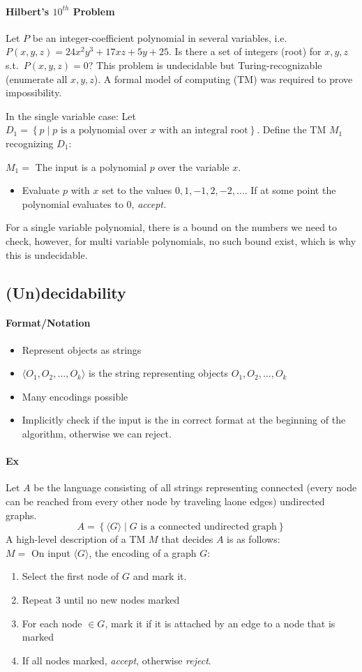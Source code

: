 \documentclass[12 pt]{article}
\begin{document}
\paragraph{Hilbert's $10^{th}$ Problem}
Let $P$ be an integer-coefficient polynomial in several variables,
i.e.\ $P(x,y,z)=24x^2y^3+17xz+5y+25$. Is there a set of integers
(root) for $x,y,z$ s.t.\ $P(x,y,z)=0$? This problem is undecidable but
Turing-recognizable (enumerate all $x,y,z$). A formal model of
computing (TM) was required to prove impossibility.

In the single variable case: Let $D_1 = \left\{p \mid p \text{ is a
    polynomial over } x \text{ with an integral root}\right\}$. Define
the TM $M_1$ recognizing $D_1$:

$M_1 =$ The input is a polynomial $p$ over the variable $x$.
\begin{itemize}
\item Evaluate $p$ with $x$ set to the values $0, 1, -1,
  2, -2, \ldots$. If at some point the polynomial evaluates to $0$,
  \textit{accept.}
\end{itemize}
For a single variable polynomial, there is a bound on the numbers we
need to check, however, for multi variable polynomials, no such bound
exist, which is why this is undecidable.
\subsection{(Un)decidability}
\paragraph{Format/Notation}
\begin{itemize}
\item Represent objects as strings
\item $\langle O_1, O_2, \ldots, O_k \rangle$ is the string
  representing objects $O_1, O_2, \ldots, O_k$
\item Many encodings possible
\item Implicitly check if the input is the in correct format at the
  beginning of the algorithm, otherwise we can reject.
\end{itemize}
\paragraph{Ex} Let $A$ be the language consisting of all strings
representing connected (every node can be reached from
every other node by traveling laone edges) undirected graphs.
$$A = \left\{\langle G \rangle \mid G \text{ is a connected undirected
    graph}\right\}$$
A high-level description of a TM $M$ that decides $A$ is as follows:
\\ $M = $ On input $\langle G \rangle$, the encoding of a graph $G$:
\begin{enumerate}
\item Select the first node of $G$ and mark it.
\item Repeat 3 until no new nodes marked
\item For each node $\in G$, mark it if it is attached by an edge to a
  node that is marked
\item If all nodes marked, \textit{accept}, otherwise \textit{reject}.
\end{enumerate}
\end{document}
